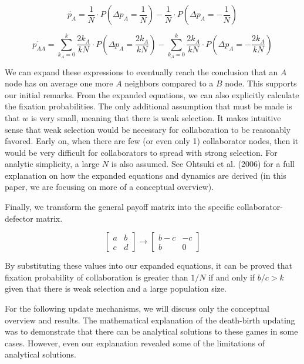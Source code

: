 \documentclass[11pt]{article}
\begin{document}
\begin{equation}
    \dot{p_A} = \frac{1}{N}\cdot P\left(\Delta p_A = \frac{1}{N}\right) - \frac{1}{N} \cdot P\left(\Delta p_A = -\frac{1}{N}\right)
\end{equation}

\begin{equation}
    \dot{p_{AA}} = \sum_{k_A = 0}^k \frac{2k_A}{kN} \cdot P\left(\Delta p_A = \frac{2k_A}{kN}\right) - \sum_{k_A = 0}^k \frac{2k_A}{kN} \cdot P\left(\Delta p_A = -\frac{2k_A}{kN}\right)
\end{equation}

We can expand these expressions to eventually reach the conclusion that an $A$ node has on average one more $A$ neighbors compared to a $B$ node. This supports our initial remarks. From the expanded equations, we can also explicitly calculate the fixation probabilities. The only additional assumption that must be made is that $w$ is very small, meaning that there is weak selection. It makes intuitive sense that weak selection would be necessary for collaboration to be reasonably favored. Early on, when there are few (or even only 1) collaborator nodes, then it would be very difficult for collaborators to spread with strong selection. For analytic simplicity, a large $N$ is also assumed. See Ohtsuki et al. (2006) for a full explanation on how the expanded equations and dynamics are derived (in this paper, we are focusing on more of a conceptual overview). 

Finally, we transform the general payoff matrix into the specific collaborator-defector matrix. 

\begin{equation}
    \begin{bmatrix}
        a & b \\
        c & d 
    \end{bmatrix}
    \rightarrow
    \begin{bmatrix}
        b - c & -c\\
        b & 0
    \end{bmatrix}
\end{equation}

By substituting these values into our expanded equations, it can be proved that fixation probability of collaboration is greater than $1 / N$ if and only if $ b / c > k$ given that there is weak selection and a large population size. 

For the following update mechanisms, we will discuss only the conceptual overview and results. The mathematical explanation of the death-birth updating was to demonstrate that there can be analytical solutions to these games in some cases. However, even our explanation revealed some of the limitations of analytical solutions. 
\end{document}
